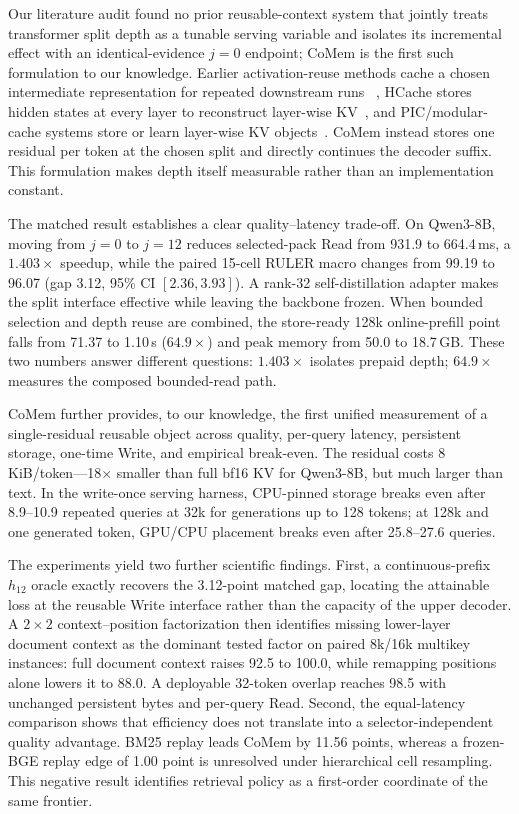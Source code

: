 Our literature audit found no prior reusable-context system that jointly treats
transformer split depth as a tunable serving variable and isolates its
incremental effect with an identical-evidence $j{=}0$ endpoint; CoMem is the
first such formulation to our knowledge. Earlier activation-reuse methods cache a
chosen intermediate representation for repeated downstream runs
~\citep{readonce,embeddingrecycling}, HCache stores hidden states at every layer
to reconstruct layer-wise KV~\citep{hcache}, and PIC/modular-cache systems
store or learn layer-wise KV objects~\citep{cacheblend,epic,kvpacket,cartridgesbase}.
CoMem instead stores one residual per token at the chosen split and directly
continues the decoder suffix. This formulation makes depth itself measurable
rather than an implementation constant.

The matched result establishes a clear quality--latency trade-off. On
Qwen3-8B, moving from $j{=}0$ to $j{=}12$ reduces selected-pack Read from
931.9 to 664.4\,ms, a $1.403\times$ speedup, while the paired 15-cell RULER
macro changes from 99.19 to 96.07 (gap 3.12, 95\% CI $[2.36,3.93]$). A
rank-32 self-distillation adapter makes the split interface effective while
leaving the backbone frozen. When bounded selection and depth reuse are
combined, the store-ready 128k online-prefill point falls from 71.37 to
1.10\,s ($64.9\times$) and peak memory from 50.0 to 18.7\,GB. These two
numbers answer different questions: $1.403\times$ isolates prepaid depth;
$64.9\times$ measures the composed bounded-read path.

CoMem further provides, to our knowledge, the first unified measurement of a
single-residual reusable object across quality, per-query latency, persistent
storage, one-time Write, and empirical break-even. The residual costs
8\,KiB/token---18$\times$ smaller than full bf16 KV for Qwen3-8B, but much
larger than text. In the write-once serving harness, CPU-pinned storage breaks
even after 8.9--10.9 repeated queries at 32k for generations up to 128 tokens;
at 128k and one generated token, GPU/CPU placement breaks even after
25.8--27.6 queries.

The experiments yield two further scientific findings. First, a
continuous-prefix $h_{12}$ oracle exactly recovers the 3.12-point matched gap,
locating the attainable loss at the reusable Write interface rather than the
capacity of the upper decoder. A $2{\times}2$ context--position factorization
then identifies missing lower-layer document context as the dominant tested
factor on paired 8k/16k multikey instances: full document context raises 92.5
to 100.0, while remapping positions alone lowers it to 88.0. A deployable
32-token overlap reaches 98.5 with unchanged persistent bytes and per-query
Read. Second, the equal-latency comparison shows that efficiency does not
translate into a selector-independent quality advantage. BM25 replay leads
CoMem by 11.56 points, whereas a frozen-BGE replay edge of 1.00 point is
unresolved under hierarchical cell resampling. This negative result identifies
retrieval policy as a first-order coordinate of the same frontier.

